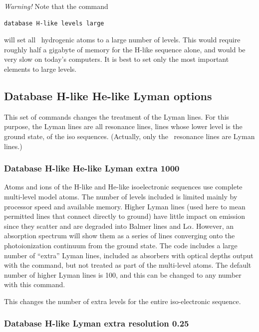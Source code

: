 \emph{Warning!}  Note that the command
\begin{verbatim}
database H-like levels large
\end{verbatim}
will set all \LIMELM\ hydrogenic atoms to a large number of levels.
This would
require roughly half a gigabyte of memory for the H-like sequence alone,
and would be very slow on today's computers.
It is best to set only the
most important elements to large levels.

\subsection{Database H-like \OR{} He-like Lyman options}

This set of commands changes the treatment of the Lyman lines.
For this purpose, the Lyman lines are all resonance lines,
lines whose lower level is the ground state,  of the  iso sequences.
(Actually, only the \hi\ resonance lines are Lyman lines.)

\subsubsection{Database H-like \OR{} He-like Lyman extra 1000}  

Atoms and ions of the H-like and He-like
isoelectronic sequences use complete multi-level model atoms.
The number of levels included is limited mainly by processor speed and
available memory.
Higher Lyman lines (used here to mean permitted lines that connect directly
to ground) have little impact on emission since they
scatter and are degraded
into Balmer lines and L$\alpha $.
However, an absorption spectrum will show them
as a series of lines converging onto the photoionization continuum from
the ground state.
The code includes a large number of ``extra'' Lyman lines,
included as absorbers with optical depths output with
the  command,
but not treated as part of the multi-level atoms.
The default number of higher Lyman lines is 100, and
this can be changed to any number with this command.

This changes the number of extra levels for the entire iso-electronic sequence.

\subsubsection{Database H-like Lyman extra resolution 0.25}


